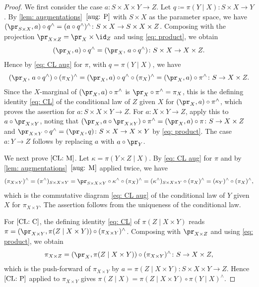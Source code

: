 \documentclass[12pt,reqno]{amsart}%
\theoremstyle{plain}
\theoremstyle{definition}
\begin{document}
\begin{proof}
	We first consider the case $a\colon S\times X\times Y\rightarrow Z$.
	 Let $q\coloneqq\pi(Y\mid X)\colon S\times X\rightarrow Y$.
	By \cref{lem: augmentations}~$\ref{aug: P}$ with $S\times X$ as the parameter space, we have
	$(\pr_{S\times X},a)\circ q^\wedge=(a\circ q^\wedge)^\wedge\colon S\times X\rightarrow S\times X\times Z$.  Composing with the projection
	$\pr_{X\times Z}=\pr_X\times\id_Z$ and using \eqref{eq: product}, we obtain
	\[
		(\pr_X,a)\circ q^\wedge=(\pr_X,\,a\circ q^\wedge)\colon S\times X\rightarrow X\times Z.
	\]
	Hence by \eqref{eq: CL aug} for $\pi$, with $q=\pi(Y\mid X)$, we have
	\[
		(\pr_X,\,a\circ q^\wedge)\circ(\pi_X)^\wedge=(\pr_X,a)\circ q^\wedge\circ(\pi_X)^\wedge=(\pr_X,a)\circ\pi^\wedge\colon S\rightarrow X\times Z.
	\]
	Since the $X$-marginal of $(\pr_X,a)\circ\pi^\wedge$ is $\pr_X\circ\pi^\wedge=\pi_X$,
	this is the defining identity \eqref{eq: CL} of the conditional law of $Z$ given $X$
	for $(\pr_X,a)\circ\pi^\wedge$, which proves the assertion for $a\colon S\times X\times Y\rightarrow Z$.
	For $a\colon X\times Y\rightarrow Z$, apply this to $a\circ\pr_{X\times Y}$, noting that
	$(\pr_X,a\circ\pr_{X\times Y})\circ\pi^\wedge=(\pr_X,a)\circ\pi\colon S\rightarrow X\times Z$ and
	$\pr_{X\times Y}\circ q^\wedge=(\pr_X,q)\colon S\times X\rightarrow X\times Y$ by \eqref{eq: product}.
	The case $a\colon Y\rightarrow Z$ follows by replacing $a$ with $a\circ\pr_Y$.

	We next prove $\ref{CL: M}$.  Let $\kappa=\pi(Y\times Z\mid X)$.
	By \eqref{eq: CL aug} for $\pi$ and by \cref{lem: augmentations}~$\ref{aug: M}$ applied twice, we have
	\[
		(\pi_{X\times Y})^\wedge=(\pi^\wedge)_{S\times X\times Y}
		=\pr_{S\times X\times Y}\circ\kappa^\wedge\circ(\pi_X)^\wedge
		=(\kappa^\wedge)_{S\times X\times Y}\circ(\pi_X)^\wedge
		=(\kappa_Y)^\wedge\circ(\pi_X)^\wedge,
	\]
	which is the commutative diagram \eqref{eq: CL aug} of the conditional law of $Y$ given $X$ for $\pi_{X\times Y}$.
	The assertion follows from the uniqueness of the conditional law.

	For $\ref{CL: C}$, the defining identity \eqref{eq: CL} of $\pi(Z\mid X\times Y)$ reads
	$\pi=(\pr_{X\times Y},\pi(Z\mid X\times Y))\circ(\pi_{X\times Y})^\wedge$.
	Composing with $\pr_{X\times Z}$ and using \eqref{eq: product}, we obtain
	\[
		\pi_{X\times Z}=(\pr_X,\pi(Z\mid X\times Y))\circ(\pi_{X\times Y})^\wedge\colon S\rightarrow X\times Z,
	\]
	which is the push-forward of $\pi_{X\times Y}$ by $a=\pi(Z\mid X\times Y)\colon S\times X\times Y\rightarrow Z$.
	Hence $\ref{CL: P}$ applied to $\pi_{X\times Y}$ gives
	$\pi(Z\mid X)=\pi(Z\mid X\times Y)\circ\pi(Y\mid X)^\wedge$.
\end{proof}
\end{document}
